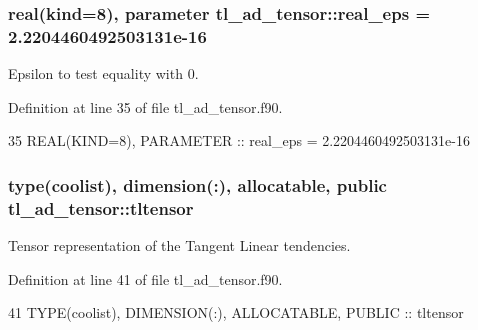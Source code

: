 \subsubsection[{\texorpdfstring{real\+\_\+eps}{real_eps}}]{\setlength{\rightskip}{0pt plus 5cm}real(kind=8), parameter tl\+\_\+ad\+\_\+tensor\+::real\+\_\+eps = 2.\+2204460492503131e-\/16\hspace{0.3cm}{\ttfamily [private]}}\hypertarget{namespacetl__ad__tensor_a05a4b79ccb098a47a400e175e12c1c6c}{}\label{namespacetl__ad__tensor_a05a4b79ccb098a47a400e175e12c1c6c}


Epsilon to test equality with 0. 



Definition at line 35 of file tl\+\_\+ad\+\_\+tensor.\+f90.


\begin{DoxyCode}
35   \textcolor{keywordtype}{REAL(KIND=8)}, \textcolor{keywordtype}{PARAMETER} :: real\_eps = 2.2204460492503131e-16
\end{DoxyCode}
\subsubsection[{\texorpdfstring{tltensor}{tltensor}}]{\setlength{\rightskip}{0pt plus 5cm}type({\bf coolist}), dimension(\+:), allocatable, public tl\+\_\+ad\+\_\+tensor\+::tltensor}\hypertarget{namespacetl__ad__tensor_a6180cfcc4d4ad119ef93266ea955903c}{}\label{namespacetl__ad__tensor_a6180cfcc4d4ad119ef93266ea955903c}


Tensor representation of the Tangent Linear tendencies. 



Definition at line 41 of file tl\+\_\+ad\+\_\+tensor.\+f90.


\begin{DoxyCode}
41   \textcolor{keywordtype}{TYPE}(coolist), \textcolor{keywordtype}{DIMENSION(:)}, \textcolor{keywordtype}{ALLOCATABLE}, \textcolor{keywordtype}{PUBLIC} :: tltensor
\end{DoxyCode}
